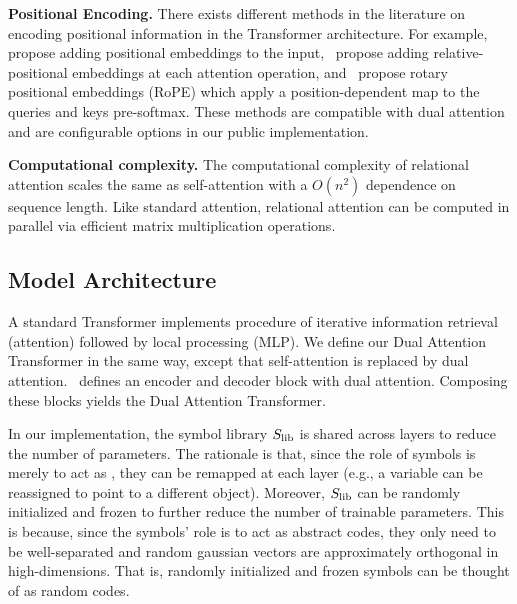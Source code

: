 \textbf{Positional Encoding.} There exists different methods in the literature on encoding positional information in the Transformer architecture. For example,~\citet{vaswani2017attention} propose adding positional embeddings to the input,~\citet{shawSelfAttentionRelativePosition2018b} propose adding relative-positional embeddings at each attention operation, and~\citet{suRoFormerEnhancedTransformer2023} propose rotary positional embeddings (RoPE) which apply a position-dependent map to the queries and keys pre-softmax. These methods are compatible with dual attention and are configurable options in our public implementation.

\textbf{Computational complexity.} The computational complexity of relational attention scales the same as self-attention with a $O(n^2)$ dependence on sequence length. Like standard attention, relational attention can be computed in parallel via efficient matrix multiplication operations.

\subsection{Model Architecture}

A standard Transformer implements procedure of iterative information retrieval (attention) followed by local processing (MLP). We define our Dual Attention Transformer in the same way, except that self-attention is replaced by dual attention.~ defines an encoder and decoder block with dual attention. Composing these blocks yields the Dual Attention Transformer.

\begin{remark}
    In our implementation, the symbol library $S_\mathrm{lib}$ is shared across layers to reduce the number of parameters. 
    The rationale is that, since the role of symbols is merely to act as , they can be remapped at each layer (e.g., a variable can be reassigned to point to a different object).
    Moreover, $S_\mathrm{lib}$ can be randomly initialized and frozen to further reduce the number of trainable parameters. This is because, since the symbols' role is to act as abstract codes, they only need to be well-separated and random gaussian vectors are approximately orthogonal in high-dimensions. That is, randomly initialized and frozen symbols can be thought of as random codes.
\end{remark}

